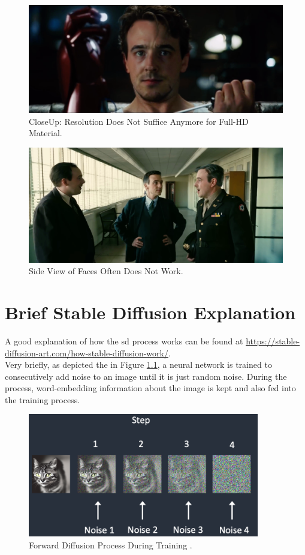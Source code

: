 \documentclass[
  a4paper,  %
  twoside,  %
  bibliography=totoc,
  headsepline,
  cleardoublepage=empty,
  parskip=half,
  draft=false
]{scrbook}
\begin{document}
\begin{figure}[h]
  \centering
  \includegraphics[width=1\textwidth]{./graphics/inswapper/iron-man-too-close.png}
  \caption{CloseUp: Resolution Does Not Suffice Anymore for Full-HD Material.}
\end{figure}
\begin{figure}[h]
  \centering
  \includegraphics[width=1\textwidth]{./graphics/inswapper/oppenheimer1.png}
  \caption{Side View of Faces Often Does Not Work.}
\end{figure}

\chapter{Brief Stable Diffusion Explanation}
\label{app:diff-workflow}
A good explanation of how the \gls{sd} process works can be found at \url{https://stable-diffusion-art.com/how-stable-diffusion-work/}. \\
Very briefly, as depicted the in Figure \ref{fig:forward-diff}, a neural network is trained to consecutively add noise to an image until it is just random noise. During the process, word-embedding information about the image is kept and also fed into the training process.
\begin{figure}[h]
  \centering
  \includegraphics[width=0.9\textwidth]{./graphics/forward-diff.png}
  \caption{Forward Diffusion Process During Training \cite{andrewHowDoesStable2022}.}
  \label{fig:forward-diff}
\end{figure}
\end{document}
